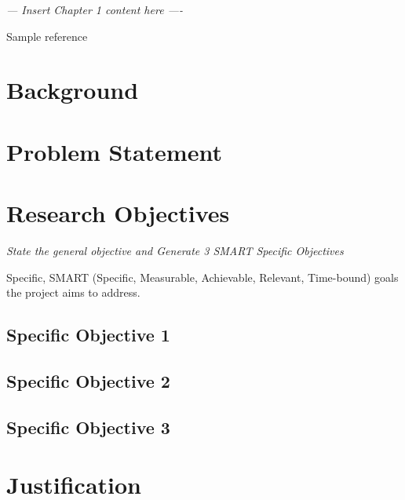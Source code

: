 \textit{--- Insert Chapter 1 content here ----}

Sample reference~\cite{https://doi.org/10.1111/j.1471-1842.2009.00848.x}

\section{Background}
\label{ch01:sec:background}


\section{Problem Statement}
\label{ch01:sec:Problem-Statement}



\section{Research Objectives}
\label{ch01:sec:Research-Objectives}
\textit{State the general objective and Generate 3 SMART Specific Objectives}

Specific, SMART (Specific, Measurable, Achievable, Relevant, Time-bound) goals the project aims to address.


\subsection{Specific  Objective 1}	


\subsection{Specific  Objective 2}
\subsection{Specific  Objective 3}



\section{Justification}
\label{ch01:sec:Justification}








